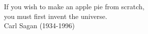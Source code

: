 
\begin{epigrafe}
  If you wish to make an apple pie from scratch, \\
  you must first invent the universe. \\
  Carl Sagan (1934-1996)
\end{epigrafe}

